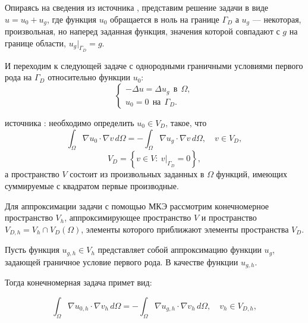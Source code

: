 \documentclass[12pt, a4paper]{article}
\begin{document}
			Опираясь на сведения из источника \cite{Galanin}, представим решение задачи в виде $u = u_0 + u_g$, где функция $u_0$ обращается в ноль на границе $\Gamma_D$ а $u_g$ --- некоторая, произвольная, но наперед заданная функция, значения которой совпадают с $g$ на границе области, $u_g |_{\Gamma_D} = g$.
			
			И переходим к следующей задаче с однородными граничными условиями первого рода на $\Gamma_D$ относительно функции $u_0$:
			\begin{equation*}
			\begin{cases}
				- \Delta u  = \Delta u_g \ \  \text{в}\ \  \Omega, \\
				u_0 = 0 \ \ \text{на}\ \  \Gamma_D.
			\end{cases}			
			\end{equation*}
			
			 источника \cite{Galanin}: необходимо определить $u_0 \in V_D$, такое, что 
			\begin{equation*}
				\int_{\Omega} \nabla u_0 \cdot \nabla v \, d\Omega = 
				- \int_{\Omega} \nabla u_g \cdot \nabla v \, d\Omega, \quad v \in V_D,
			\end{equation*}			
			\begin{equation*}
				V_D = \left\{ v \in V: \ v |_{\Gamma_D} = 0 \right\},
			\end{equation*}
			а пространство $V$ состоит из произвольных заданных в $\Omega$ функций, имеющих суммируемые с квадратом первые производные.
			
			Для аппроксимации задачи с помощью МКЭ рассмотрим конечномерное пространство $V_h$, аппроксимирующее пространство $V$ и пространство 
			$V_{D,h} = V_h \cap V_D(\Omega)$, элементы которого приближают элементы пространства $V_D$. 
			
			Пусть функция $u_{g,h} \in V_h $ представляет собой аппроксимацию функции $u_g$, задающей граничное условие первого рода. В качестве функции $u_{g,h}$. 
			
			Тогда конечномерная задача примет вид: 
			
			\begin{equation*}
				\int_{\Omega} \nabla u_{0,h} \cdot \nabla v_{h} \, d\Omega = 
				- \int_{\Omega} \nabla u_{g,h} \cdot \nabla v_{h} \, d\Omega, \quad v_{h} \in V_{D,h},
			\end{equation*}
			
\end{document}
